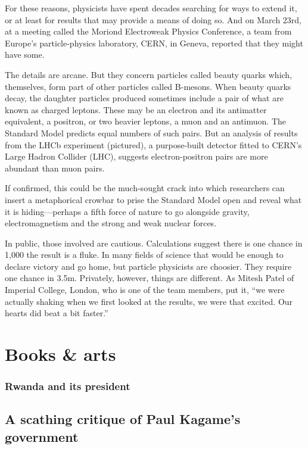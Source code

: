 \documentclass{article}
\begin{document}
For these reasons, physicists have spent decades searching for ways to extend it, or at least for results that may provide a means of doing so. And on March 23rd, at a meeting called the Moriond Electroweak Physics Conference, a team from Europe's particle-physics laboratory, CERN, in Geneva, reported that they might have some. 

The details are arcane. But they concern particles called beauty quarks which, themselves, form part of other particles called B-mesons. When beauty quarks decay, the daughter particles produced sometimes include a pair of what are known as charged leptons. These may be an electron and its antimatter equivalent, a positron, or two heavier leptons, a muon and an antimuon. The Standard Model predicts equal numbers of such pairs. But an analysis of results from the LHCb experiment (pictured), a purpose-built detector fitted to CERN's Large Hadron Collider (LHC), suggests electron-positron pairs are more abundant than muon pairs. 

If confirmed, this could be the much-sought crack into which researchers can insert a metaphorical crowbar to prise the Standard Model open and reveal what it is hiding---perhaps a fifth force of nature to go alongside gravity, electromagnetism and the strong and weak nuclear forces. 

In public, those involved are cautious. Calculations suggest there is one chance in 1,000 the result is a fluke. In many fields of science that would be enough to declare victory and go home, but particle physicists are choosier. They require one chance in 3.5m. Privately, however, things are different. As Mitesh Patel of Imperial College, London, who is one of the team members, put it, ``we were actually shaking when we first looked at the results, we were that excited. Our hearts did beat a bit faster.'' 
\clearpage
\section{Books \& arts }
\subsubsection{Rwanda and its president }
\subsection{A scathing critique of Paul Kagame's government }
\end{document}
